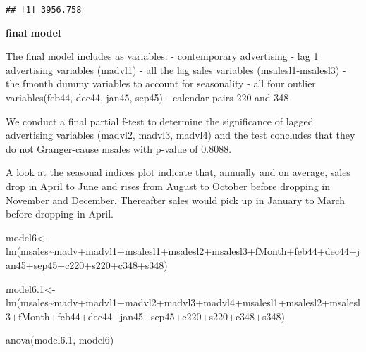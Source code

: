 \documentclass[
]{article}
\newenvironment{Shaded}{\begin{snugshade}}{\end{snugshade}}
\newcommand{\FloatTok}[1]{\textcolor[rgb]{0.00,0.00,0.81}{#1}}
\newcommand{\FunctionTok}[1]{\textcolor[rgb]{0.00,0.00,0.00}{#1}}
\newcommand{\NormalTok}[1]{#1}
\newcommand{\OtherTok}[1]{\textcolor[rgb]{0.56,0.35,0.01}{#1}}
\newcommand{\SpecialCharTok}[1]{\textcolor[rgb]{0.00,0.00,0.00}{#1}}
\begin{document}
\begin{verbatim}
## [1] 3956.758
\end{verbatim}

\textbf{final model}

The final model includes as variables: - contemporary advertising - lag
1 advertising variables (madvl1) - all the lag sales variables
(msalesl1-msalesl3) - the fmonth dummy variables to account for
seasonality - all four outlier variables(feb44, dec44, jan45, sep45) -
calendar pairs 220 and 348

We conduct a final partial f-test to determine the significance of
lagged advertising variables (madvl2, madvl3, madvl4) and the test
concludes that they do not Granger-cause msales with p-value of 0.8088.

A look at the seasonal indices plot indicate that, annually and on
average, sales drop in April to June and rises from August to October
before dropping in November and December. Thereafter sales would pick up
in January to March before dropping in April.

\begin{Shaded}
\begin{Highlighting}[]
\NormalTok{model6}\OtherTok{\textless{}{-}} \FunctionTok{lm}\NormalTok{(msales}\SpecialCharTok{\textasciitilde{}}\NormalTok{madv}\SpecialCharTok{+}\NormalTok{madvl1}\SpecialCharTok{+}\NormalTok{msalesl1}\SpecialCharTok{+}\NormalTok{msalesl2}\SpecialCharTok{+}\NormalTok{msalesl3}\SpecialCharTok{+}\NormalTok{fMonth}\SpecialCharTok{+}\NormalTok{feb44}\SpecialCharTok{+}\NormalTok{dec44}\SpecialCharTok{+}\NormalTok{jan45}\SpecialCharTok{+}\NormalTok{sep45}\SpecialCharTok{+}\NormalTok{c220}\SpecialCharTok{+}\NormalTok{s220}\SpecialCharTok{+}\NormalTok{c348}\SpecialCharTok{+}\NormalTok{s348)}

\NormalTok{model6}\FloatTok{.1}\OtherTok{\textless{}{-}} \FunctionTok{lm}\NormalTok{(msales}\SpecialCharTok{\textasciitilde{}}\NormalTok{madv}\SpecialCharTok{+}\NormalTok{madvl1}\SpecialCharTok{+}\NormalTok{madvl2}\SpecialCharTok{+}\NormalTok{madvl3}\SpecialCharTok{+}\NormalTok{madvl4}\SpecialCharTok{+}\NormalTok{msalesl1}\SpecialCharTok{+}\NormalTok{msalesl2}\SpecialCharTok{+}\NormalTok{msalesl3}\SpecialCharTok{+}\NormalTok{fMonth}\SpecialCharTok{+}\NormalTok{feb44}\SpecialCharTok{+}\NormalTok{dec44}\SpecialCharTok{+}\NormalTok{jan45}\SpecialCharTok{+}\NormalTok{sep45}\SpecialCharTok{+}\NormalTok{c220}\SpecialCharTok{+}\NormalTok{s220}\SpecialCharTok{+}\NormalTok{c348}\SpecialCharTok{+}\NormalTok{s348)}

\FunctionTok{anova}\NormalTok{(model6}\FloatTok{.1}\NormalTok{, model6)}
\end{Highlighting}
\end{Shaded}
\end{document}
